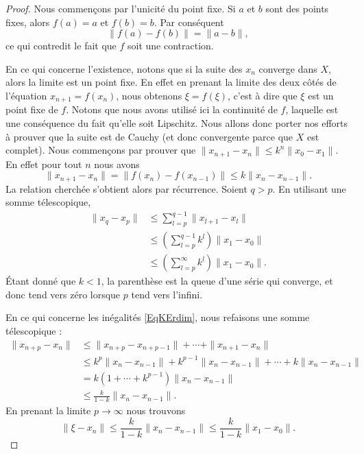 \begin{proof}

    Nous commençons par l'unicité du point fixe. Si \( a\) et \( b\) sont des points fixes, alors \( f(a)=a\) et \( f(b)=b\). Par conséquent
    \begin{equation}
        \| f(a)-f(b) \|=\| a-b \|,
    \end{equation}
    ce qui contredit le fait que \( f\) soit une contraction.

    En ce qui concerne l'existence, notons que si la suite des \( x_n\) converge dans \( X\), alors la limite est un point fixe. En effet en prenant la limite des deux côtés de l'équation \( x_{n+1}=f(x_n)\), nous obtenons \( \xi=f(\xi)\), c'est à dire que \( \xi\) est un point fixe de \( f\). Notons que nous avons utilisé ici la continuité de \( f\), laquelle est une conséquence du fait qu'elle soit Lipschitz. Nous allons donc porter nos efforts à prouver que la suite est de Cauchy (et donc convergente parce que \( X\) est complet). Nous commençons par prouver que \( \| x_{n+1}-x_n \|\leq k^n\| x_0-x_1 \|\). En effet pour tout \( n\) nous avons
    \begin{equation}
        \| x_{n+1}-x_n \|=\| f(x_n)-f(x_{n-1}) \|\leq k\| x_n-x_{n-1} \|.
    \end{equation}
    La relation cherchée s'obtient alors par récurrence. Soient \( q>p\). En utilisant une somme télescopique,
    \begin{subequations}
        \begin{align}
            \| x_q-x_p \|&\leq \sum_{l=p}^{q-1}\| x_{l+1}-x_l \|\\
            &\leq\left( \sum_{l=p}^{q-1}k^l \right)\| x_1-x_0 \|\\
            &\leq\left(\sum_{l=p}^{\infty}k^l\right)\| x_1-x_0 \|.
        \end{align}
    \end{subequations}
    Étant donné que \( k<1\), la parenthèse est la queue d'une série qui converge, et donc tend vers zéro lorsque \( p\) tend vers l'infini.

    En ce qui concerne les inégalités \eqref{EqKErdim}, nous refaisons une somme télescopique :
    \begin{subequations}
        \begin{align}
            \| x_{n+p}-x_n \|&\leq \| x_{n+p}-x_{n+p-1} \|+\cdots +\| x_{n+1}-x_n \|\\
            &\leq k^p\| x_n-x_{n-1} \|+k^{p-1}\| x_n-x_{n-1} \|+\cdots +k\| x_n-x_{n-1} \|\\
            &=k(1+\cdots +k^{p-1})\| x_n-x_{n-1}\|  \\
            &\leq \frac{ k }{ 1-k }\| x_n-x_{n-1} \|.
        \end{align}
    \end{subequations}
    En prenant la limite \( p\to \infty\) nous trouvons
    \begin{equation}        \label{EqlUMVGW}
        \| \xi-x_n \|\leq \frac{ k }{ 1-k }\| x_n-x_{n-1} \|\leq \frac{ k }{ 1-k }\| x_1-x_0 \|.
    \end{equation}


\end{proof}
